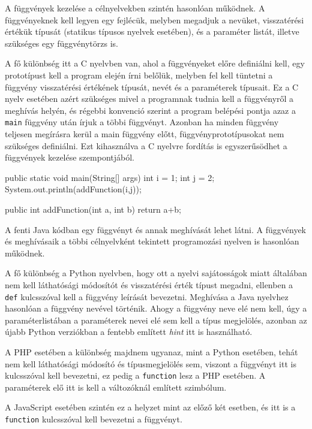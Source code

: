 
A függvények kezelése a célnyelvekben szintén hasonlóan működnek. A függvényeknek kell legyen egy fejlécük, melyben megadjuk a nevüket, visszatérési értékük típusát (statikus típusos nyelvek esetében), és a paraméter listát, illetve szükséges egy függvénytörzs is.

A fő különbség itt a C nyelvben van, ahol a függvényeket előre definiálni kell, egy prototípust kell a program elején írni belőlük, melyben fel kell tüntetni a függvény visszatérési értékének típusát, nevét és a paraméterek típusait. Ez a C nyelv esetében azért szükséges mivel a programnak tudnia kell a függvényről a meghívás helyén, és régebbi konvenció szerint a program belépési pontja azaz a \texttt{main} függvény után írjuk a többi függvényt. Azonban ha minden függvény teljesen megírásra kerül a main függvény előtt, függvényprototípusokat nem szükséges definiálni. Ezt kihasználva a C nyelvre fordítás is egyszerűsödhet a függvények kezelése szempontjából.
\begin{cpp}
	public static void main(String[] args) {
		int i = 1;
		int j = 2;
		System.out.println(addFunction(i,j));
	}
	
	public int addFunction(int a, int b) {
		return a+b;
	}
\end{cpp}
A fenti Java kódban egy függvényt és annak meghívását lehet látni. A függvények és meghívásaik a többi célnyelvként tekintett programozási nyelven is hasonlóan működnek.

A fő különbség a Python nyelvben, hogy ott a nyelvi sajátosságok miatt általában nem kell láthatósági módosítót és visszatérési érték típust megadni, ellenben a \texttt{def} kulcsszóval kell a függvény leírását bevezetni. Meghívása a Java nyelvhez hasonlóan a függvény nevével történik. Ahogy a függvény neve elé nem kell, úgy a paraméterlistában a paraméterek nevei elé sem kell a típus megjelölés, azonban az újabb Python verziókban a fentebb említett \textit{hint} itt is használható.

A PHP esetében a különbség majdnem ugyanaz, mint a Python esetében, tehát nem kell láthatósági módosító és típusmegjelölés sem, viszont a függvényt itt is kulcsszóval kell bevezetni, ez pedig a \texttt{function} lesz a PHP esetében. A paraméterek elő itt is kell a változóknál említett \textdollar szimbólum.

A JavaScript esetében szintén ez a helyzet mint az előző két esetben, és itt is a \texttt{function} kulcsszóval kell bevezetni a függvényt.

